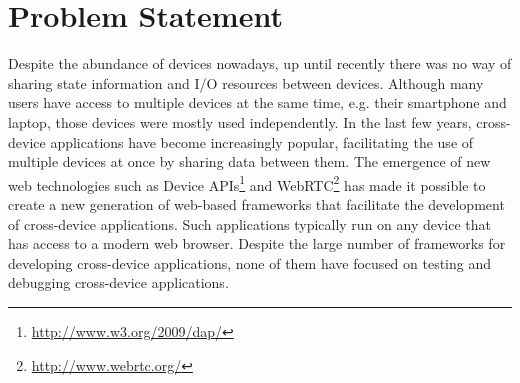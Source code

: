 \section{Problem Statement}

Despite the abundance of devices nowadays, up until recently there was no way of sharing state information and I/O resources between devices. Although many users have access to multiple devices at the same time, e.g. their smartphone and laptop, those devices were mostly used independently. In the last few years, cross-device applications have become increasingly popular, facilitating the use of multiple devices at once by sharing data between them. The emergence of new web technologies such as Device APIs\footnote{\url{http://www.w3.org/2009/dap/}} and WebRTC\footnote{\url{http://www.webrtc.org/}} has made it possible to create a new generation of web-based frameworks that facilitate the development of cross-device applications. Such applications typically run on any device that has access to a modern web browser. Despite the large number of frameworks for developing cross-device applications, none of them have focused on testing and debugging cross-device applications.

